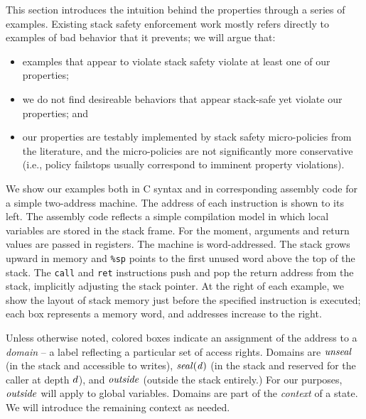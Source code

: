 \documentclass[acmsmall,review,anonymous]{acmart}\settopmatter{printfolios=true,printccs=false,printacmref=false}
\begin{document}
This section introduces the intuition behind the properties through a series
of examples. Existing stack safety enforcement work mostly refers directly to examples
of bad behavior that it prevents; we will argue that: 

\begin{itemize}
\item examples that appear to violate stack safety violate at least one of our properties;
\item we do not find desireable behaviors that appear stack-safe yet violate our properties; and
\item our properties are testably implemented by stack safety micro-policies from the
  literature, and the micro-policies are not significantly more conservative
  (i.e., policy failstops usually correspond to imminent property violations).
\end{itemize}

We show our examples both in C syntax and in corresponding assembly code for a
simple two-address machine. The address of each instruction is shown to its left.
The assembly code reflects a simple compilation model in which
local variables are stored in the stack frame.
For the moment, arguments and return values are passed in registers.
The machine is word-addressed. The stack grows upward in
memory and {\tt \%sp} points to the first unused word above the top of the stack.
The {\tt call} and {\tt ret} instructions push and pop the return address from the stack,
implicitly adjusting the stack pointer.
At the right of each example, we show the layout of stack memory just before
the specified instruction is executed; each box represents a memory word, and
addresses increase to the right.

Unless otherwise noted, colored boxes
indicate an assignment of the address to a
{\em domain} -- a label reflecting a particular set of access rights. Domains
are \(\mathit{unseal}\) (in the stack and accessible to writes), \(\mathit{seal(d)}\)
(in the stack and reserved for the caller at depth \(d\)), and \(\mathit{outside}\)
(outside the stack entirely.) For our purposes, \(\mathit{outside}\) will apply to global
variables. Domains are part of the {\em context} of a state.
We will introduce the remaining context as needed.
\end{document}
